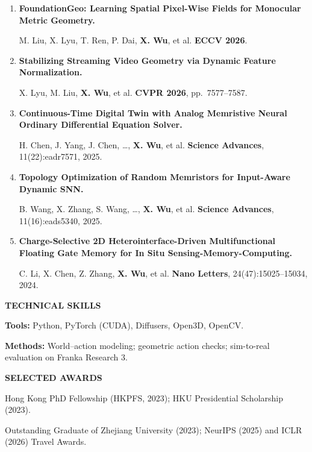 \documentclass[a4paper]{article}
\newcommand{\cvsection}[1]{%
  \par\vspace{2.0pt}%
  {\color{cvblue}\fontsize{11}{12.2}\selectfont\bfseries\MakeUppercase{#1}}\par
  \vspace{-4pt}{\color{cvblue}\rule{\textwidth}{0.4pt}}\par\vspace{1.0pt}%
}
\begin{document}
{\begin{enumerate}[resume,leftmargin=1.6em,labelsep=0.38em,itemsep=0.4pt,topsep=1.3pt,parsep=0pt,partopsep=0pt]
M. Liu, T. Liu, J. Xia, X. Lyu, \textbf{X. Wu}, et al. \hfill \textbf{CoRL 2026}.
\item \textbf{FoundationGeo: Learning Spatial Pixel-Wise Fields for Monocular Metric Geometry.}\par
M. Liu, X. Lyu, T. Ren, P. Dai, \textbf{X. Wu}, et al. \hfill \textbf{ECCV 2026}.
\item \textbf{Stabilizing Streaming Video Geometry via Dynamic Feature Normalization.}\par
X. Lyu, M. Liu, \textbf{X. Wu}, et al. \hfill \textbf{CVPR 2026}, pp.\ 7577--7587.
\item \textbf{Continuous-Time Digital Twin with Analog Memristive Neural Ordinary Differential Equation Solver.}\par
H. Chen, J. Yang, J. Chen, \ldots, \textbf{X. Wu}, et al. \hfill \textbf{Science Advances}, 11(22):eadr7571, 2025.
\item \textbf{Topology Optimization of Random Memristors for Input-Aware Dynamic SNN.}\par
B. Wang, X. Zhang, S. Wang, \ldots, \textbf{X. Wu}, et al. \hfill \textbf{Science Advances}, 11(16):eads5340, 2025.
\item \textbf{Charge-Selective 2D Heterointerface-Driven Multifunctional Floating Gate Memory for In Situ Sensing-Memory-Computing.}\par
C. Li, X. Chen, Z. Zhang, \textbf{X. Wu}, et al. \hfill \textbf{Nano Letters}, 24(47):15025--15034, 2024.
\end{enumerate}}

\cvsection{Technical Skills}
\textbf{Tools:} Python, PyTorch (CUDA), Diffusers, Open3D, OpenCV.\par
\textbf{Methods:} World--action modeling; geometric action checks; sim-to-real evaluation on Franka Research 3.


\cvsection{Selected Awards}
Hong Kong PhD Fellowship (HKPFS, 2023); HKU Presidential Scholarship (2023).\par
Outstanding Graduate of Zhejiang University (2023); NeurIPS (2025) and ICLR (2026) Travel Awards.
\end{document}

